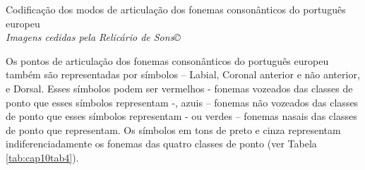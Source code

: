 \documentclass[output=paper,colorlinks,citecolor=brown,booklanguage=portuguese]{langscibook}
\begin{document}
\begin{Tabela}
\caption{{Codificação dos modos de articulação dos fonemas consonânticos do português europeu\\
\emph{Imagens cedidas pela Relicário de Sons©}}
}
\label{tab:cap10tab3}

\end{Tabela}


Os pontos de articulação dos fonemas consonânticos do português europeu também são representadas por símbolos – Labial, Coronal anterior e não anterior, e Dorsal. Esses símbolos podem ser vermelhos - fonemas vozeados das classes de ponto que esses símbolos representam -, azuis – fonemas não vozeados das classes de ponto que esses símbolos representam - ou verdes – fonemas nasais das classes de ponto que representam. Os símbolos em tons de preto e cinza representam indiferenciadamente os fonemas das quatro classes de ponto (ver Tabela \ref{tab:cap10tab4}).
\end{document}
